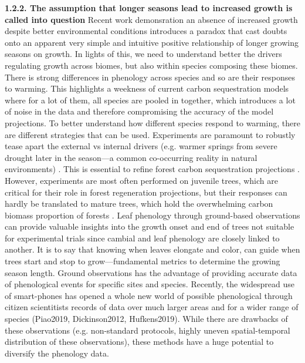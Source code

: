 \documentclass{article}
\begin{document}
\textbf{1.2.2. The assumption that longer seasons lead to increased growth is called into question}
Recent work demonsration an absence of increased growth despite better environmental conditions introduces a paradox that cast doubts onto an apparent very simple and intuitive positive relationship of longer growing seasons on growth. In lights of this, we need to understand better the drivers regulating growth across biomes, but also within species composing these biomes. There is strong differences in phenology across species and so are their responses to warming. This highlights a weekness of current carbon sequestration models where for a lot of them, all species are pooled in together, which introduces a lot of noise in the data and therefore compromising the accuracy of the model projections. To better understand how different species respond to warming, there are different strategies that can be used. Experiments are paramount to robustly tease apart the external vs internal drivers (e.g. warmer springs from severe drought later in the season---a common co-occurring reality in natural environments) \cite{morin_changes_2010,primack_observations_2015}. This is essential to refine forest carbon sequestration projections \cite{green_limits_2022,cabon_cross-biome_2022}. However, experiments are most often performed on juvenile trees, which are critical for their role in forest regeneration projections, but their responses can hardly be translated to mature trees, which hold the overwhelming carbon biomass proportion of forests \cite{augspurger_differences_2003,silvestro_longer_2023,vitasse_ontogenic_2013}. Leaf phenology through ground-based observations can provide valuable insights into the growth onset and end of trees not suitable for experimental trials since cambial and leaf phenology are closely linked to another. It is to say that knowing when leaves elongate and color, can guide when trees start and stop to grow---fundamental metrics to determine the growing season length. Ground observations has the advantage of providing accurate data of phenological events for specific sites and species. Recently, the widespread use of smart-phones has opened a whole new world of possible phenological through citizen scientitists records of data over much larger areas and for a wider range of species (Piao2019, Dickinson2012, Hufkens2019). While there are drawbacks of these observations (e.g. non-standard protocols, highly uneven spatial-temporal distribution of these observations), these methods have a huge potential to diversify the phenology data. %
\end{document}
